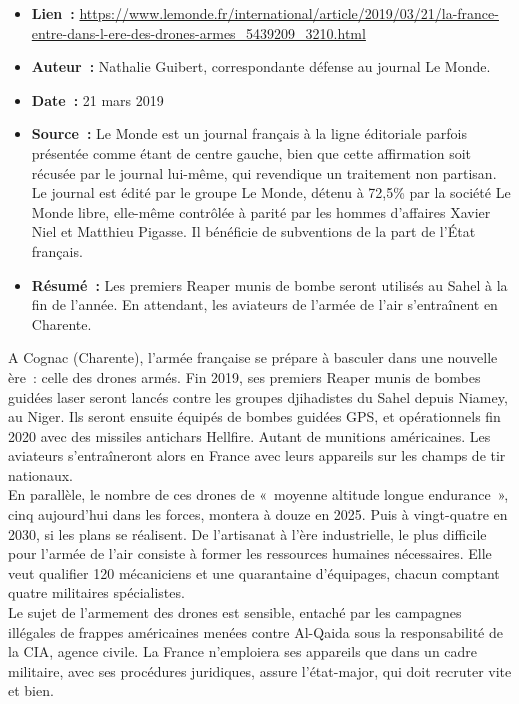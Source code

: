 \documentclass[8pt]{article}
\begin{document}
\begin{itemize}
	\item \textbf{Lien~: }  \url{https://www.lemonde.fr/international/article/2019/03/21/la-france-entre-dans-l-ere-des-drones-armes_5439209_3210.html} 
	\item \textbf{Auteur~: }  Nathalie Guibert, correspondante défense au journal Le Monde.
	\item \textbf{Date~: } 21 mars 2019
	\item \textbf{Source~: } Le Monde est un journal  français à la ligne éditoriale parfois présentée comme étant de centre gauche, bien que cette affirmation soit récusée par le journal lui-même, qui revendique un traitement non partisan. Le journal est édité par le groupe Le Monde, détenu à 72,5\% par la société Le Monde libre, elle-même contrôlée à parité par les hommes d'affaires Xavier Niel et Matthieu Pigasse. Il bénéficie de subventions de la part de l'État français. 
	\item \textbf{Résumé~: } Les premiers Reaper munis de bombe seront utilisés au Sahel à la fin de l’année. En attendant, les aviateurs de l’armée de l’air s’entraînent en Charente. 
\end{itemize}

A Cognac (Charente), l’armée française se prépare à basculer dans une nouvelle ère~: celle des drones armés. Fin 2019, ses premiers Reaper munis de bombes guidées laser seront lancés contre les groupes djihadistes du Sahel depuis Niamey, au Niger. Ils seront ensuite équipés de bombes guidées GPS, et opérationnels fin 2020 avec des missiles antichars Hellfire. Autant de munitions américaines. Les aviateurs s’entraîneront alors en France avec leurs appareils sur les champs de tir nationaux.\\

En parallèle, le nombre de ces drones de «~moyenne altitude longue endurance~», cinq aujourd’hui dans les forces, montera à douze en 2025. Puis à vingt-quatre en 2030, si les plans se réalisent. De l’artisanat à l’ère industrielle, le plus difficile pour l’armée de l’air consiste à former les ressources humaines nécessaires. Elle veut qualifier 120 mécaniciens et une quarantaine d’équipages, chacun comptant quatre militaires spécialistes.\\

Le sujet de l’armement des drones est sensible, entaché par les campagnes illégales de frappes américaines menées contre Al-Qaida sous la responsabilité de la CIA, agence civile. La France n’emploiera ses appareils que dans un cadre militaire, avec ses procédures juridiques, assure l’état-major, qui doit recruter vite et bien.\\
\end{document}

